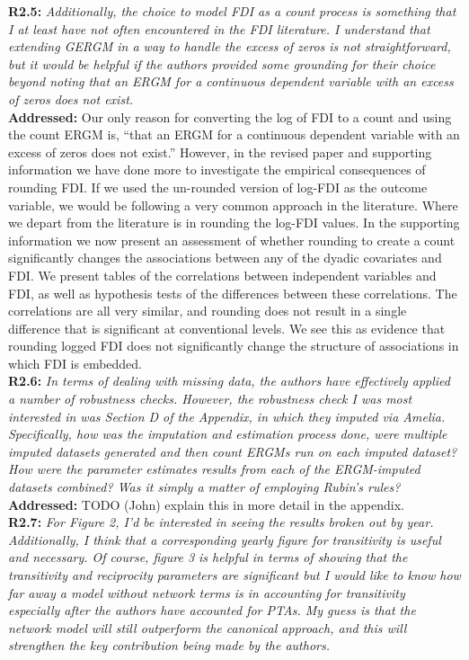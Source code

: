 \documentclass[a4paper,11pt]{texMemo}
\begin{document}
\noindent \textbf{R2.5:} \emph{Additionally, the choice to model FDI as a count process is something that I at least have not often encountered in the FDI literature. I understand that extending GERGM in a way to handle the excess of zeros is not straightforward, but it would be helpful if the authors provided some grounding for their choice beyond noting that an ERGM for a continuous dependent variable with an excess of zeros does not exist.}\\

\noindent \textbf{Addressed:} Our only reason for converting the log of FDI to a count and using the count ERGM is, ``that an ERGM for a continuous dependent variable with an excess of zeros does not exist.'' However, in the revised paper and supporting information we have done more to investigate the empirical consequences of rounding FDI. If we used the un-rounded version of log-FDI as the outcome variable, we would be following a very common approach in the literature. Where we depart from the literature is in rounding the log-FDI values. In the supporting information we now present an assessment of whether rounding to create a count significantly changes the associations between any of the dyadic covariates and FDI. We present tables of the correlations between independent variables and FDI, as well as hypothesis tests of the differences between these correlations. The correlations are all very similar, and rounding does not result in a single difference that is significant at conventional levels. We see this as evidence that rounding logged FDI does not significantly change the structure of associations in which FDI is embedded. \\

\noindent \textbf{R2.6:} \emph{In terms of dealing with missing data, the authors have effectively applied a number of robustness checks. However, the robustness check I was most interested in was Section D of the Appendix, in which they imputed via Amelia. Specifically, how was the imputation and estimation process done, were multiple imputed datasets generated and then count ERGMs run on each imputed dataset? How were the parameter estimates results from each of the ERGM-imputed datasets combined? Was it simply a matter of employing Rubin's rules?}\\

\noindent \textbf{Addressed:} TODO (John) explain this in more detail in the appendix. \\

\noindent \textbf{R2.7:} \emph{For Figure 2, I'd be interested in seeing the results broken out by year. Additionally, I think that a corresponding yearly figure for transitivity is useful and necessary. Of course, figure 3 is helpful in terms of showing that the transitivity and reciprocity parameters are significant but I would like to know how far away a model without network terms is in accounting for transitivity especially after the authors have accounted for PTAs. My guess is that the network model will still outperform the canonical approach, and this will strengthen the key contribution being made by the authors.}\\
\end{document}
